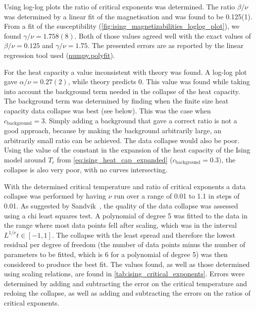 \documentclass[11pt, a4paper]{report} %
\begin{document}
Using log-log plots the ratio of critical exponents was determined.
The ratio \(\beta/\nu\) was determined by a linear fit of the magnetisation and was found to be 0.125(1).
From a fit of the susceptibility (\cref{fig:ising_magnetizabilities_loglog_plot}), we found \(\gamma/\nu = 1.758(8)\).
Both of those values agreed well with the exact values of \(\beta/\nu = 0.125\) and \(\gamma/\nu = 1.75\).
The presented errors are as reported by the linear regression tool used (\url{numpy.polyfit}).

For the heat capacity a value inconsistent with theory was found.
A log-log plot gave \(\alpha /\nu = 0.27(2)\), while theory predicts 0.
This value was found while taking into account the background term needed in the collapse of the heat capacity.
The background term was determined by finding when the finite size heat capacity data collapse was best (see below). This was the case when \(c_{\mathrm{background}} = 3\).
Simply adding a background that gave a correct ratio is not a good approach, because by making the background arbitrarily large, an arbitrarily small ratio can be achieved.
The data collapse would also be poor.
Using the value of the constant in the expansion of the heat capacity of the Ising model around \(T_c\) from \cref{eq:ising_heat_cap_expanded} (\(c_{\mathrm{background}} = 0.3)\), the collapse is also very poor, with no curves intersecting.

With the determined critical temperature and ratio of critical exponents a data collapse was performed by having \(\nu\) run over a range of 0.01 to 1.1 in steps of 0.01.
As suggested by Sandvik~\cite{sandvik:2011}, the quality of the data collapse was assessed using a chi least squares test.
A polynomial of degree 5 was fitted to the data in the range where most data points fell after scaling, which was in the interval \(L^{1/\nu}t \in [-1, 1]\).
The collapse with the least spread and therefore the lowest residual per degree of freedom (the number of data points minus the number of parameters to be fitted, which is 6 for a polynomial of degree 5) was then considered to produce the best fit.
The values found, as well as those determined using scaling relations, are found in \cref{tab:ising_critical_exponents}.
Errors were determined by adding and subtracting the error on the critical temperature and redoing the collapse, as well as adding and subtracting the errors on the ratios of critical exponents.
\end{document}
